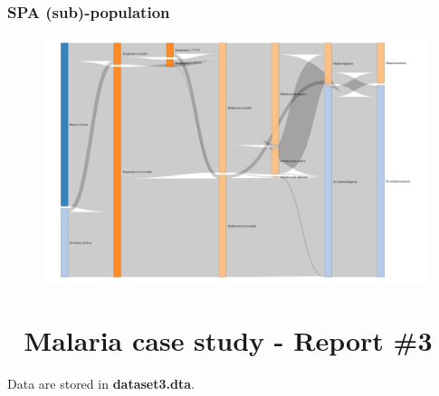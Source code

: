 \documentclass[
  letterpaper,
  DIV=11,
  numbers=noendperiod,
  oneside]{scrreprt}
\begin{document}
\hypertarget{spa-sub-population}{%
\subsection{SPA (sub)-population}\label{spa-sub-population}}

\begin{figure}

\includegraphics{./malaria_case_study_02_report_files/figure-pdf/unnamed-chunk-13-1.pdf}

\end{figure}

\hypertarget{malaria-case-study---report-3}{%
\chapter{\texorpdfstring{{📙} Malaria case study - Report
\#3}{📙 Malaria case study - Report \#3}}\label{malaria-case-study---report-3}}

Data are stored in \textbf{dataset3.dta}.
\end{document}
